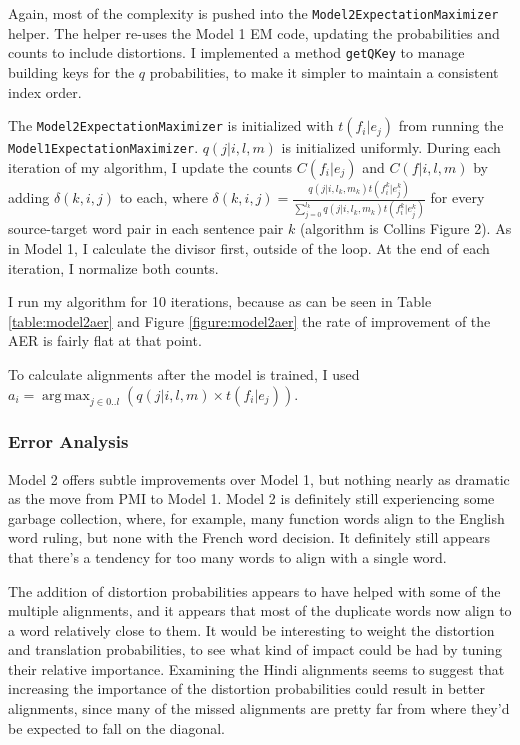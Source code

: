 \documentclass[11pt]{article}
\DeclareMathOperator*{\argmax}{arg\,max}
\begin{document}
Again, most of the complexity is pushed into
the \texttt{Model2ExpectationMaximizer} helper.  The helper re-uses the Model 1
EM code, updating the probabilities and counts to include distortions.  I implemented
a method \texttt{getQKey} to manage building keys for the $ q $ probabilities, 
to make it simpler to maintain a consistent index order. 

The \texttt{Model2ExpectationMaximizer} is initialized with $ t(f_i|e_j) $ 
from running the \texttt{Model1ExpectationMaximizer}.  $ q(j|i,l,m) $ is 
initialized uniformly.
During each iteration of my algorithm, I update the counts 
$ C(f_i|e_j) $ and $ C(f|i,l,m) $
by adding $ \delta(k, i, j) $ to each, where 
$ \delta(k, i, j) = \frac{q(j|i,l_k,m_k)t(f_i^k|e_j^k)}{\sum_{j=0}^{l_k}q(j|i,l_k,m_k)t(f_i^k|e_j^k)} $ 
for every source-target word pair in each sentence pair $ k $ (algorithm is Collins Figure 2).
As in Model 1, I calculate the divisor first, outside of the loop.
At the end of each iteration, I normalize both counts.

I run my algorithm for 10 iterations, because as can be seen in Table \ref{table:model2aer}
and Figure \ref{figure:model2aer} the rate of improvement of the AER is fairly flat at that
point.

To calculate alignments after the model is trained, I used 
$ a_i = \argmax_{j\in{0..l}} (q(j|i,l,m) \times t(f_i|e_j)) $.

\subsubsection{Error Analysis}

Model 2 offers subtle improvements over Model 1, but nothing nearly as dramatic as the move
from PMI to Model 1.  Model 2 is definitely still experiencing some garbage collection,
where, for example, many function words align to the English word ruling, but none with the
French word decision.  It definitely still appears that there's a tendency for too many
words to align with a single word.

The addition of distortion probabilities appears to have helped with some of the multiple
alignments, and it appears that most of the duplicate words now align to a word relatively
close to them.  It would be interesting to weight the distortion and translation probabilities,
to see what kind of impact could be had by tuning their relative importance.  Examining the 
Hindi alignments seems to suggest that increasing the importance of the distortion
probabilities could result in better alignments, since many of the missed alignments are pretty
far from where they'd be expected to fall on the diagonal.
\end{document}
